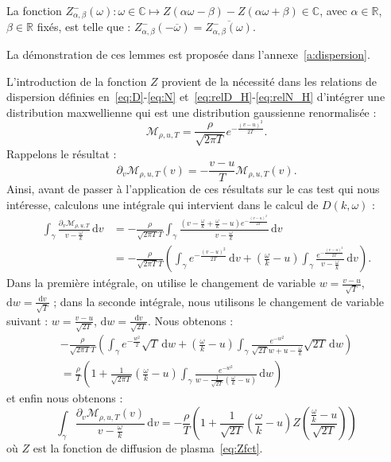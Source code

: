 \begin{lemma}
  La fonction $Z_{\alpha,\beta}^-(\omega):\omega\in\mathbb{C}\mapsto Z\left(\alpha\omega-\beta\right)-Z\left(\alpha\omega+\beta\right)\in\mathbb{C}$, avec $\alpha\in\mathbb{R}$, $\beta\in\mathbb{R}$ fixés, est telle que : $Z_{\alpha,\beta}^-\left(-\overline{\omega}\right)=\overline{Z_{\alpha,\beta}^-(\omega)}$.
  \label{lemma:Z-}
\end{lemma}

La démonstration de ces lemmes est proposée dans l'annexe~\ref{a:dispersion}.

L'introduction de la fonction $Z$ provient de la nécessité dans les relations de dispersion définies en~\eqref{eq:D}-\eqref{eq:N} et~\eqref{eq:relD_H}-\eqref{eq:relN_H} d'intégrer une distribution maxwellienne qui est une distribution gaussienne renormalisée :
$$
  \mathcal{M}_{\rho,u,T} = \frac{\rho}{\sqrt{2\pi T}}e^{-\frac{(v-u)^2}{2T}}.
$$
Rappelons le résultat :
$$
  \partial_v \mathcal{M}_{\rho,u,T}(v) = -\frac{v-u}{T}\mathcal{M}_{\rho,u,T}(v).
$$
Ainsi, avant de passer à l'application de ces résultats sur le cas test qui nous intéresse, calculons une intégrale qui intervient dans le calcul de $D(k,\omega)$ :
$$
  \begin{aligned}
    \int_\gamma \frac{\partial_v\mathcal{M}_{\rho,u,T}}{v-\frac{\omega}{k}}\,\mathrm{d}v 
      & = -\frac{\rho}{\sqrt{2\pi T}T}\int_\gamma \frac{(v-\frac{\omega}{k} + \frac{\omega}{k}-u)e^{-\frac{(v-u)^2}{2T}}}{v-\frac{\omega}{k}}\,\mathrm{d}v \\
      & = -\frac{\rho}{\sqrt{2\pi T}T}\left( \int_\gamma e^{-\frac{(v-u)^2}{2T}}\,\mathrm{d}v + \left(\frac{\omega}{k}-u\right)\int_\gamma \frac{e^{-\frac{(v-u)^2}{2T}}}{v-\frac{\omega}{k}}\,\mathrm{d}v \right).
  \end{aligned}
$$
Dans la première intégrale, on utilise le changement de variable $w = \frac{v-u}{\sqrt{T}}$, $\mathrm{d}w = \frac{\mathrm{d}v}{\sqrt{T}}$ ; dans la seconde intégrale, nous utilisons le changement de variable suivant : $w=\frac{v-u}{\sqrt{2T}}$, $\mathrm{d}w = \frac{\mathrm{d}v}{\sqrt{2T}}$. Nous obtenons :
$$
  \begin{aligned}
    -\frac{\rho}{\sqrt{2\pi T}T}\left( \int_\gamma e^{-\frac{w^2}{2}}\sqrt{T}\,\mathrm{d}w + \left(\frac{\omega}{k}-u\right)\int_\gamma \frac{e^{-w^2}}{\sqrt{2T}w + u - \frac{\omega}{k}}\sqrt{2T}\,\mathrm{d}w \right) \\
    = \frac{\rho}{T}\left( 1 + \frac{1}{\sqrt{2\pi T}}\left(\frac{\omega}{k}-u\right)\int_\gamma \frac{e^{-w^2}}{w-\frac{1}{\sqrt{2T}}\left(\frac{\omega}{k}-u\right)}\,\mathrm{d}w \right)
  \end{aligned}
$$
et enfin nous obtenons :
\begin{equation}
  \int_\gamma \frac{\partial_v \mathcal{M}_{\rho,u,T}(v)}{v-\frac{\omega}{k}}\,\mathrm{d}v
    = -\frac{\rho}{T}\left( 1 + \frac{1}{\sqrt{2T}}\left(\frac{\omega}{k}-u\right)Z\left(\frac{\frac{\omega}{k}-u}{\sqrt{2T}}\right) \right)
    \label{eq:intforM}
\end{equation}
où $Z$ est la fonction de diffusion de plasma~\eqref{eq:Zfct}.

